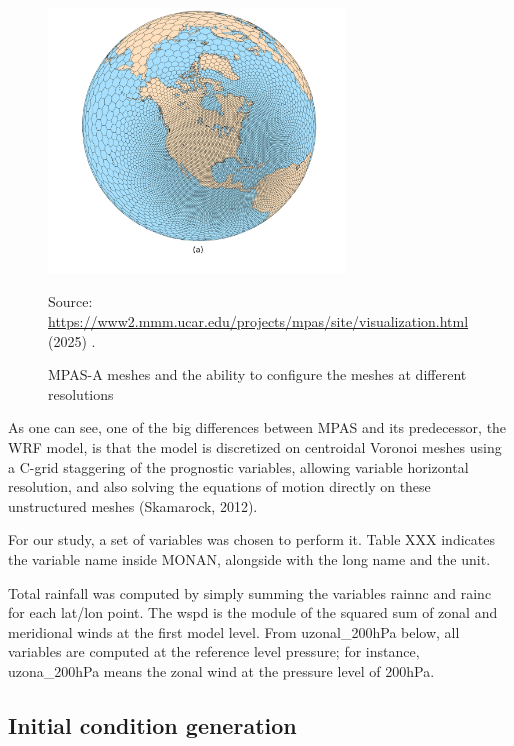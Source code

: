 \begin{figure}[htbp]
	\centering
	\caption{MPAS-A meshes and the ability to configure the meshes at different resolutions} 
	\includegraphics[width=0.7\textwidth, trim=10 70 10 0, clip]{docs/figuras/chapter3/ncl_plots_a.png} %
	\vspace{2mm}
	
	\centering 
	Source: \url{https://www2.mmm.ucar.edu/projects/mpas/site/visualization.html} (2025) .\par
	\label{fig:mpas-a} %
\end{figure}

As one can see, one of the big differences between MPAS and its predecessor, the WRF model, is that the model is discretized on centroidal Voronoi meshes using a C-grid staggering of the prognostic variables, allowing variable horizontal resolution, and also solving the equations of motion directly on these unstructured meshes (Skamarock, 2012). 

For our study, a set of variables was chosen to perform it. Table XXX indicates the variable name inside MONAN, alongside with the long name and the unit.


Total rainfall was computed by simply summing the variables rainnc and rainc for each lat/lon point. The wspd is the module of the squared sum of zonal and meridional winds at the first model level. From uzonal\_200hPa below, all variables are computed at the reference level pressure; for instance, uzona\_200hPa means the zonal wind at the pressure level of 200hPa.

\subsection{Initial condition generation}

